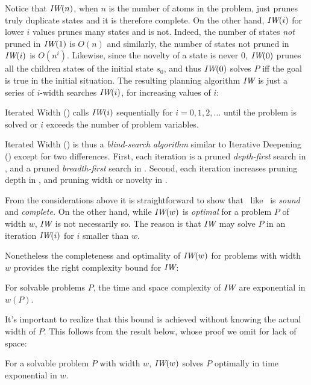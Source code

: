 \documentclass[letterpaper]{article}
\begin{document}
Notice that ${\textit{IW}}(n)$, when $n$ is the number of atoms in the problem, just prunes truly duplicate states
and it  is therefore complete.
On the other hand, ${\textit{IW}}(i)$ for lower $i$ values prunes many states and is not.
Indeed, the number of states \emph{not} pruned in ${\textit{IW}}(1)$  is $O(n)$
and similarly, the number of states not pruned in ${\textit{IW}}(i)$ is $O(n^i)$.
Likewise, since the novelty of a state is never $0$, ${\textit{IW}}(0)$ prunes all the children
states of the initial state $s_0$, and thus ${\textit{IW}}(0)$  solves  $P$ iff
the goal is true in the initial situation.  The resulting planning algorithm ${\textit{IW}}$
is just a series of $i$-width searches ${\textit{IW}}(i)$, for increasing values of $i$:

\begin{definition}
Iterated Width  (\IR) calls ${\textit{IW}}(i)$ sequentially for $i=0,1,2,\ldots$ until
the problem is solved or $i$ exceeds the number of problem variables.
\end{definition}



Iterated  Width (\IR) is thus a \emph{blind-search algorithm} similar to Iterative Deepening (\ID)
except for two differences. First, each iteration  is a pruned \emph{depth-first} search in \ID,
and  a pruned \emph{breadth-first} search in \IR. Second,  each iteration increases pruning  depth
in \ID, and pruning width or novelty in \IR.


From the considerations above it is straightforward to show that
\IR\ like \ID\ is \emph{sound} and \emph{complete.}  On the other
hand, while ${\textit{IW}}(w)$ is \emph{optimal} for a problem $P$ of width $w$,
${\textit{IW}}$ is not necessarily so. The reason is that ${\textit{IW}}$ may solve $P$ in
an iteration ${\textit{IW}}(i)$ for $i$ smaller than $w$.%


Nonetheless the completeness and optimality of ${\textit{IW}}(w)$ for problems
with width $w$ provides the right complexity bound for ${\textit{IW}}$:
%
\begin{theorem}
For solvable problems $P$, the time and space complexity of ${\textit{IW}}$
are  exponential in $w(P)$.
\end{theorem}
%
It's important to realize that this bound is achieved without knowing the
actual width of $P$. This follows from the result below, whose
proof we omit for lack of space:

\begin{theorem}
For a  solvable problem $P$ with width $w$,  ${\textit{IW}}(w)$ solves $P$ optimally
in time exponential in $w$.
\end{theorem}
\end{document}
